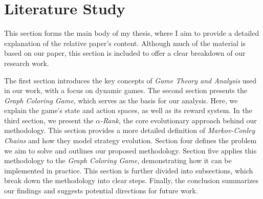 \section{Literature Study}

    This section forms the main body of my thesis, where I aim to provide a detailed explanation of the relative paper's content. Although much of the material is based on our paper, this section is included to offer a clear breakdown of our research work.\tinydouble

    \noindent
    The first section introduces the key concepts of \emph{Game Theory and Analysis} used in our work, with a focus on dynamic games. The second section presents the \emph{Graph Coloring Game}, which serves as the basis for our analysis. Here, we explain the game's state and action spaces, as well as its reward system. In the third section, we present the \emph{$\alpha$-Rank}, the core evolutionary approach behind our methodology. This section provides a more detailed definition of \emph{Markov-Conley Chains} and how they model strategy evolution. Section four defines the problem we aim to solve and outlines our proposed methodology. Section five applies this methodology to the \emph{Graph Coloring Game}, demonstrating how it can be implemented in practice. This section is further divided into subsections, which break down the methodology into clear steps. Finally, the conclusion summarizes our findings and suggests potential directions for future work.

\newpage


\newpage


\newpage


\newpage


\newpage


\newpage


\newpage